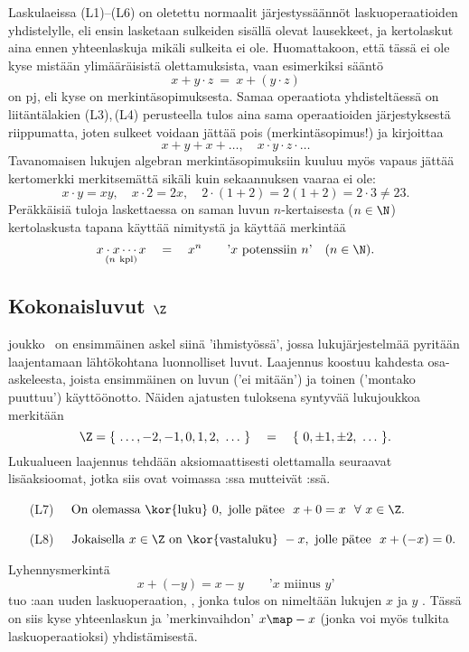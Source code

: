 Laskulaeissa (L1)--(L6) on oletettu normaalit järjestyssäännöt laskuoperaatioiden yhdistelylle,
eli ensin lasketaan sulkeiden sisällä olevat lausekkeet, ja kertolaskut aina ennen yhteenlaskuja
mikäli sulkeita ei ole. Huomattakoon, että tässä ei ole kyse mistään ylimääräisistä 
olettamuksista, vaan esimerkiksi sääntö
\[
x + y \cdot z\ =\ x + (y \cdot z)
\]
on  pj, eli kyse on merkintäsopimuksesta. Samaa
operaatiota yhdisteltäessä on  liitäntälakien (L3),\,(L4) perusteella tulos aina sama
operaatioiden järjestyksestä riippumatta, joten sulkeet voidaan jättää pois (merkintäsopimus!)
ja kirjoittaa
\[
x + y + x + \ldots, \quad x \cdot y \cdot z \cdot \ldots
\]
Tavanomaisen lukujen algebran merkintäsopimuksiin kuuluu myös vapaus jättää kertomerkki
merkitsemättä sikäli kuin sekaannuksen vaaraa ei ole:
\[
x \cdot y = xy, \quad x \cdot 2 = 2x, \quad  2\cdot(1+2) = 2(1+2) = 2 \cdot 3 \neq 23.
\]
Peräkkäisiä tuloja laskettaessa on saman luvun $n$-kertaisesta ($n \in \N$) kertolaskusta tapana
käyttää nimitystä  ja käyttää merkintää
\[
\underset{(n\ \text{kpl})}{x \cdot x \cdots x} \quad = \quad x^n \quad 
                              \quad \text{'$x$ potenssiin $n$'} \quad (n \in \N).
\]
   
\subsection{Kokonaisluvut $\Z$}
%

 joukko \Z\ on ensimmäinen askel siinä 'ihmistyössä', jossa 
lukujärjestelmää pyritään laajentamaan lähtökohtana luonnolliset luvut. Laajennus koostuu 
kahdesta osa-askeleesta, joista ensimmäinen on luvun  ('ei mitään') ja toinen 
 ('montako puuttuu') käyttöönotto. Näiden ajatusten tuloksena syntyvää 
lukujoukkoa merkitään
\[
\Z = \{\ \ldots,-2,-1,0,1,2,\ \ldots\ \} \quad = \quad \{\ 0,\pm 1, \pm 2,\ \ldots\ \}.
\]
Lukualueen laajennus tehdään aksiomaattisesti olettamalla seuraavat lisäaksioomat, jotka siis
ovat voimassa \Z:ssa mutteivät \N:ssä.
\begin{itemize}
\item[(L7)] $\quad \text{On olemassa \kor{luku}}\ 0,\ 
                   \text{jolle pätee}\ \ x+0 = x\ \ \forall\ x \in \Z.$
\item[(L8)] $\quad \text{Jokaisella}\ x \in \Z\ \text{on \kor{vastaluku}}\ -x,\ 
                   \text{jolle pätee}\ \ x+(-x) = 0.$
\end{itemize}
Lyhennysmerkintä
\[
x + (-y) = x - y \quad \quad \text{'$x$ miinus $y$'}
\]
tuo \Z:aan uuden laskuoperaation, , jonka tulos on nimeltään lukujen $x$ ja
$y$ .  Tässä on siis kyse yhteenlaskun ja 'merkinvaihdon' $x \map -x$ (jonka voi 
myös tulkita laskuoperaatioksi) yhdistämisestä.

